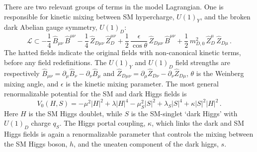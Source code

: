 There are two relevant groups of terms in the model Lagrangian. One is responsible for kinetic mixing between SM hypercharge, $U(1)_Y$, and the broken dark Abelian gauge symmetry, $U(1)_D$:
%
\begin{equation}\label{eq:KM}
\mathcal{L} \subset -\frac{1}{4} \,\hat B_{\mu\nu}\, \hat B^{\mu\nu} - \frac{1}{4} \,\hat Z_{D\mu\nu}\, \hat Z_D^{\mu\nu}  + \frac{1}{2}\,\frac{\epsilon}{\cos\theta} \,\hat Z_ {D\mu\nu}\,\hat B^{\mu\nu} + \frac{1}{2}\, m_{D,0}^2\, \hat Z_D^\mu \, \hat Z_{D\mu}\, .
\end{equation}
%
The hatted fields indicate the original fields with non-canonical
kinetic terms, before any field redefinitions. 
%
The $U(1)_Y$ and
$U(1)_D$ field strengths are respectively $\hat B_{\mu\nu}
=\partial_\mu \hat B_{\nu} - \partial_\nu \hat B_{\mu}$ and $\hat
Z_{D\mu\nu} =\partial_\mu \hat Z_{D\nu} - \partial_\nu \hat Z_{D\mu}$,
$\theta$ is the Weinberg mixing angle, and $\epsilon$ is the kinetic
mixing parameter.
The most general renormalizable potential for the SM and dark Higgs fields is 
\begin{equation}
\label{eq:HM}
V_0 (H,S) =   -\mu^2|H|^2 +  \lambda |H|^4 -\mu_S^2 |S|^2 + \lambda_S |S|^4 +
   \kappa  |S|^2|H|^2\, .
\end{equation}
Here $H$ is the SM Higgs doublet, while $S$ is the SM-singlet `dark
Higgs' with $U(1)_D$ charge $q_S$.  The Higgs portal coupling, $\kappa$, which links the dark and SM Higgs fields is again a renormalizable parameter that controls the mixing between the SM Higgs boson, $h$, and the uneaten component of the dark higgs, $s$. 





